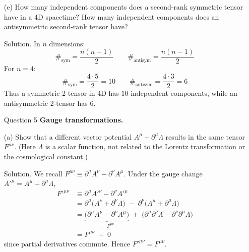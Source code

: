 \documentclass[12pt]{article}
\begin{document}
\begin{enumerate}
  \item[(e)] How many independent components does a second-rank symmetric tensor have in a 4D spacetime? How many independent components does an antisymmetric second-rank tensor have?
  \item[Solution.]  
  In $n$ dimensions:
  $$
  \#_{\text{sym}} = \frac{n(n+1)}{2}
  \qquad 
  \#_{\text{antisym}} = \frac{n(n-1)}{2}
  $$
  For $n=4$:
  $$
  \#_{\text{sym}} = \frac{4\cdot 5}{2} = 10
  \qquad 
  \#_{\text{antisym}} = \frac{4\cdot 3}{2} = 6
  $$
  Thus a symmetric 2-tensor in 4D has $10$ independent components, while an antisymmetric 2-tensor has $6$.





  





  \newpage
  \item[Question 5] \textbf{Gauge transformations.}
    \item[(a)] Show that a different vector potential $A^{\mu}+\partial^{\mu}\Lambda$ results in the same tensor $F^{\mu\nu}$. (Here $\Lambda$ is a scalar function, not related to the Lorentz transformation or the cosmological constant.)
  \item[Solution.]
  We recall $F^{\mu\nu} \equiv \partial^{\mu}A^{\nu}-\partial^{\nu}A^{\mu}$. Under the gauge change $A'^{\mu}=A^{\mu}+\partial^{\mu}\Lambda$,
  $$
  \begin{aligned}
  F'^{\mu\nu}
  &\equiv \partial^{\mu}A'^{\nu}-\partial^{\nu}A'^{\mu} \\
  &= \partial^{\mu}\!\big(A^{\nu}+\partial^{\nu}\Lambda\big)
     \;-\;\partial^{\nu}\!\big(A^{\mu}+\partial^{\mu}\Lambda\big) \\
  &= \underbrace{\big(\partial^{\mu}A^{\nu}-\partial^{\nu}A^{\mu}\big)}_{=\,F^{\mu\nu}}
     \;+\;\big(\partial^{\mu}\partial^{\nu}\Lambda-\partial^{\nu}\partial^{\mu}\Lambda\big) \\
  &= F^{\mu\nu} \;+\; 0
  \end{aligned}
  $$
  since partial derivatives commute. Hence $F'^{\mu\nu}=F^{\mu\nu}$.

  







\end{enumerate}
\end{document}

